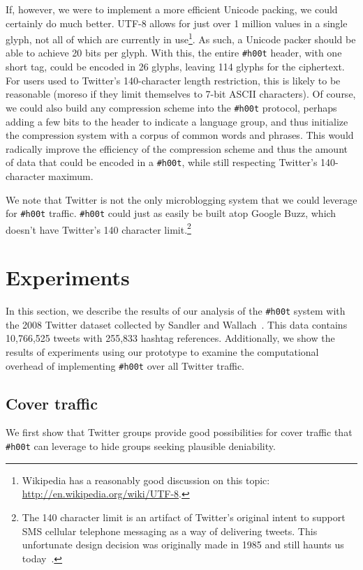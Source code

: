\documentclass{sig-alternate-arxiv}
\newcommand{\hoot}{{\tt \#h00t}\xspace}
\begin{document}
If, however, we were to implement a more efficient Unicode packing, we
could certainly do much better. UTF-8 allows for just over 1 million
values in a single glyph, not all of which are currently in use\footnote{Wikipedia has a
  reasonably good discussion on this topic:
  \url{http://en.wikipedia.org/wiki/UTF-8}.}. As such, a Unicode packer
should be able to achieve 20 bits per glyph. With this, the entire \hoot
header, with one short tag, could be encoded in 26 glyphs, leaving 114
glyphs for the ciphertext. For users used to Twitter's 140-character
length restriction,
this is likely to be reasonable (moreso if they limit themselves to
7-bit ASCII characters). Of course, we could also build any
compression scheme into the \hoot protocol, perhaps adding a 
few bits to the header to indicate a language group, and thus
initialize the compression system with a corpus of common words
and phrases. This would radically improve the efficiency of the
compression scheme and thus the amount of data that could be encoded
in a \hoot, while still respecting Twitter's 140-character maximum.

We note that Twitter is not the only microblogging system that we could
leverage for \hoot traffic. \hoot could just as easily be built atop
Google Buzz, which doesn't have Twitter's 140 character
limit.\footnote{The 140 character limit is an artifact of Twitter's
  original intent to support SMS cellular telephone messaging as a way
  of delivering tweets. This unfortunate design decision was originally
  made in 1985 and still haunts us today~\cite{latimes-char160}.}

%
\section{Experiments}
\label{sec:experiments}

In this section, we describe the results of our analysis of the \hoot
system with the 2008 Twitter dataset collected by Sandler and
Wallach~\cite{sandler09}. This data contains 10,766,525 tweets with
255,833 hashtag references. Additionally, we show the results of
experiments using our prototype to examine the computational overhead of
implementing \hoot over all Twitter traffic.

\subsection{Cover traffic}
We first show that Twitter groups provide good possibilities for cover
traffic that \hoot can leverage to hide groups seeking plausible
deniability.
\end{document}
